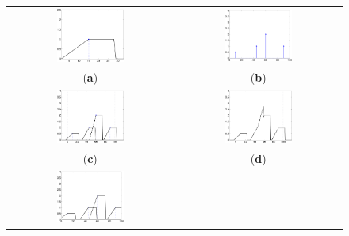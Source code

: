 \begin{figure}
\begin{tabular}{cc}
\includegraphics[width=0.425\textwidth]{./FigSparcoConvMask} &
\includegraphics[width=0.425\textwidth]{./FigSparcoConvFun} \\
({\bf{a}}) & ({\bf{b}}) \\
\includegraphics[width=0.425\textwidth]{./FigSparcoConvRegular1} &
\includegraphics[width=0.425\textwidth]{./FigSparcoConvRegular2} \\
({\bf{c}}) & ({\bf{d}}) \\
\includegraphics[width=0.425\textwidth]{./FigSparcoConvTrunc1} &

\end{tabular}
\end{figure}
